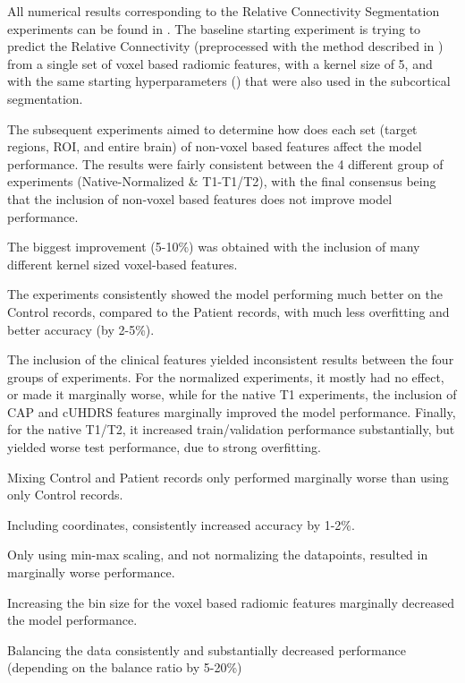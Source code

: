 All numerical results corresponding to the Relative Connectivity Segmentation experiments can be found in  .
The baseline starting experiment is trying to predict the Relative Connectivity (preprocessed with the method described in ) from a single set of voxel based radiomic features, with a kernel size of 5, and with the same starting hyperparameters () that were also used in the subcortical segmentation.\par
The subsequent experiments aimed to determine how does each set (target regions, \ac{ROI}, and entire brain) of non-voxel based features affect the model performance. The results were fairly consistent between the 4 different group of experiments (Native-Normalized \& T1-T1/T2), with the final consensus being that the inclusion of non-voxel based features does not improve model performance.\par
The biggest improvement (5-10\%) was obtained with the inclusion of many different kernel sized voxel-based features.\par
The experiments consistently showed the model performing much better on the Control records, compared to the Patient records, with much less overfitting and better accuracy (by 2-5\%).\par
The inclusion of the clinical features yielded inconsistent results between the four groups of experiments. For the normalized experiments, it mostly had no effect, or made it marginally worse, while for the native T1 experiments, the inclusion of \ac{CAP} and \ac{cUHDRS} features marginally improved the model performance. Finally, for the native T1/T2, it increased train/validation performance substantially, but yielded worse test performance, due to strong overfitting.\par
Mixing Control and Patient records only performed marginally worse than using only Control records.\par
Including coordinates, consistently increased accuracy by 1-2\%.\par
Only using min-max scaling, and not normalizing the datapoints, resulted in marginally worse performance.\par
Increasing the bin size for the voxel based radiomic features marginally decreased the model performance.\par
Balancing the data consistently and substantially decreased performance (depending on the balance ratio by 5-20\%)\par
